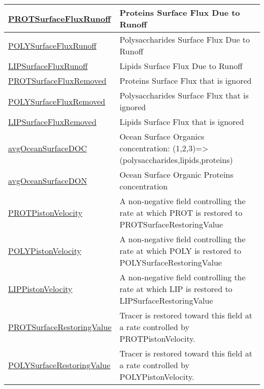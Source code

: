 {\begin{center}
\begin{longtable}{| p{2.0in} | p{4.0in} |}
    \hline
    \hyperref[subsec:var_sec_forcing_PROTSurfaceFluxRunoff]{PROTSurfaceFluxRunoff} & Proteins Surface Flux Due to Runoff \\
    \hline
    \hyperref[subsec:var_sec_forcing_POLYSurfaceFluxRunoff]{POLYSurfaceFluxRunoff} & Polysaccharides Surface Flux Due to Runoff \\
    \hline
    \hyperref[subsec:var_sec_forcing_LIPSurfaceFluxRunoff]{LIPSurfaceFluxRunoff} & Lipids Surface Flux Due to Runoff \\
    \hline
    \hyperref[subsec:var_sec_forcing_PROTSurfaceFluxRemoved]{PROTSurfaceFluxRemoved} & Proteins Surface Flux that is ignored \\
    \hline
    \hyperref[subsec:var_sec_forcing_POLYSurfaceFluxRemoved]{POLYSurfaceFluxRemoved} & Polysaccharides Surface Flux that is ignored \\
    \hline
    \hyperref[subsec:var_sec_forcing_LIPSurfaceFluxRemoved]{LIPSurfaceFluxRemoved} & Lipids Surface Flux that is ignored \\
    \hline
    \hyperref[subsec:var_sec_forcing_avgOceanSurfaceDOC]{avgOceanSurfaceDOC} & Ocean Surface Organics concentration: (1,2,3)=>(polysaccharides,lipids,proteins) \\
    \hline
    \hyperref[subsec:var_sec_forcing_avgOceanSurfaceDON]{avgOceanSurfaceDON} & Ocean Surface Organic Proteins concentration \\
    \hline
    \hyperref[subsec:var_sec_forcing_PROTPistonVelocity]{PROTPistonVelocity} & A non-negative field controlling the rate at which PROT is restored to PROTSurfaceRestoringValue \\
    \hline
    \hyperref[subsec:var_sec_forcing_POLYPistonVelocity]{POLYPistonVelocity} & A non-negative field controlling the rate at which POLY is restored to POLYSurfaceRestoringValue \\
    \hline
    \hyperref[subsec:var_sec_forcing_LIPPistonVelocity]{LIPPistonVelocity} & A non-negative field controlling the rate at which LIP is restored to LIPSurfaceRestoringValue \\
    \hline
    \hyperref[subsec:var_sec_forcing_PROTSurfaceRestoringValue]{PROTSurfaceRestoringValue} & Tracer is restored toward this field at a rate controlled by PROTPistonVelocity. \\
    \hline
    \hyperref[subsec:var_sec_forcing_POLYSurfaceRestoringValue]{POLYSurfaceRestoringValue} & Tracer is restored toward this field at a rate controlled by POLYPistonVelocity. \\

\end{longtable}
\end{center}}
